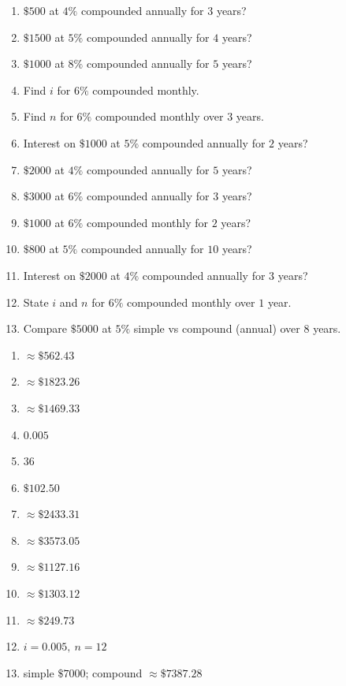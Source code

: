 \documentclass[11pt]{article}
\begin{document}
\begin{recapbox}
\begin{multicols}{2}
\small
\begin{enumerate}[leftmargin=*,itemsep=3pt]
  \item $\$500$ at $4\%$ compounded annually for $3$ years?
  \item $\$1500$ at $5\%$ compounded annually for $4$ years?
  \item $\$1000$ at $8\%$ compounded annually for $5$ years?
  \item Find $i$ for $6\%$ compounded monthly.
  \item Find $n$ for $6\%$ compounded monthly over $3$ years.
  \item Interest on $\$1000$ at $5\%$ compounded annually for $2$ years?
  \item $\$2000$ at $4\%$ compounded annually for $5$ years?
  \item $\$3000$ at $6\%$ compounded annually for $3$ years?
  \item $\$1000$ at $6\%$ compounded monthly for $2$ years?
  \item $\$800$ at $5\%$ compounded annually for $10$ years?
  \item Interest on $\$2000$ at $4\%$ compounded annually for $3$ years?
  \item State $i$ and $n$ for $6\%$ compounded monthly over $1$ year.
  \item Compare $\$5000$ at $5\%$ simple vs compound (annual) over $8$ years.
\end{enumerate}
\end{multicols}
\end{recapbox}

\begin{keybox}
\begin{multicols}{2}
\small
\begin{enumerate}[leftmargin=*,itemsep=3pt]
  \item $\approx\$562.43$
  \item $\approx\$1823.26$
  \item $\approx\$1469.33$
  \item $0.005$
  \item $36$
  \item $\$102.50$
  \item $\approx\$2433.31$
  \item $\approx\$3573.05$
  \item $\approx\$1127.16$
  \item $\approx\$1303.12$
  \item $\approx\$249.73$
  \item $i=0.005,\ n=12$
  \item simple $\$7000$; compound $\approx\$7387.28$
\end{enumerate}
\end{multicols}
\end{keybox}
\end{document}

